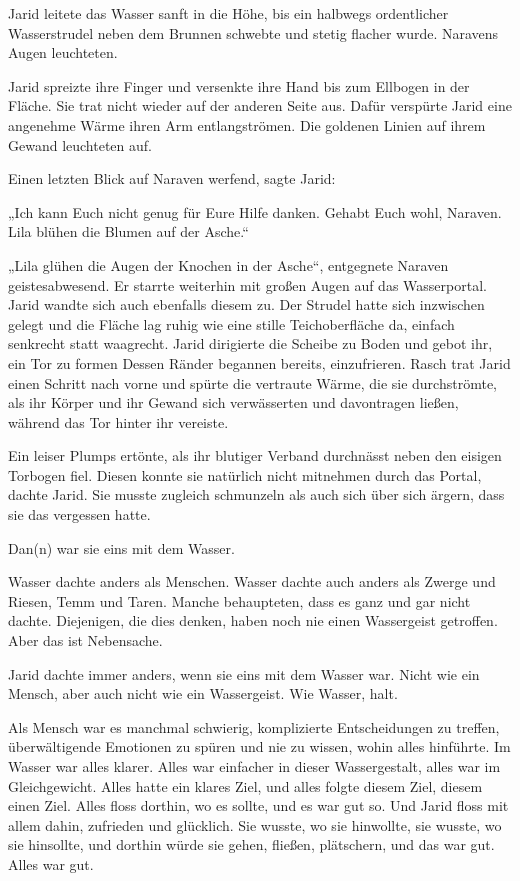 Jarid leitete das Wasser sanft in die Höhe, bis ein halbwegs ordentlicher Wasserstrudel neben dem Brunnen schwebte und stetig flacher wurde. Naravens Augen leuchteten.

Jarid spreizte ihre Finger und versenkte ihre Hand bis zum Ellbogen in der Fläche. Sie trat nicht wieder auf der anderen Seite aus. Dafür verspürte Jarid eine angenehme Wärme ihren Arm entlangströmen. Die goldenen Linien auf ihrem Gewand leuchteten auf.

Einen letzten Blick auf Naraven werfend, sagte Jarid:

„Ich kann Euch nicht genug für Eure Hilfe danken. Gehabt Euch wohl, Naraven. Lila blühen die Blumen auf der Asche.“

„Lila glühen die Augen der Knochen in der Asche“, entgegnete Naraven geistesabwesend. Er starrte weiterhin mit großen Augen auf das Wasserportal. Jarid wandte sich auch ebenfalls diesem zu. Der Strudel hatte sich inzwischen gelegt und die Fläche lag ruhig wie eine stille Teichoberfläche da, einfach senkrecht statt waagrecht. Jarid dirigierte die Scheibe zu Boden und gebot ihr, ein Tor zu formen Dessen Ränder begannen bereits, einzufrieren. Rasch trat Jarid einen Schritt nach vorne und spürte die vertraute Wärme, die sie durchströmte, als ihr Körper und ihr Gewand sich verwässerten und davontragen ließen, während das Tor hinter ihr vereiste.

Ein leiser Plumps ertönte, als ihr blutiger Verband durchnässt neben den eisigen Torbogen fiel. Diesen konnte sie natürlich nicht mitnehmen durch das Portal, dachte Jarid. Sie musste zugleich schmunzeln als auch sich über sich ärgern, dass sie das vergessen hatte.

Dan(n) war sie eins mit dem Wasser.\bigskip







Wasser dachte anders als Menschen. Wasser dachte auch anders als Zwerge und Riesen, Temm und Taren. Manche behaupteten, dass es ganz und gar nicht dachte. Diejenigen, die dies denken, haben noch nie einen Wassergeist getroffen. Aber das ist Nebensache.

Jarid dachte immer anders, wenn sie eins mit dem Wasser war. Nicht wie ein Mensch, aber auch nicht wie ein Wassergeist. Wie Wasser, halt.

Als Mensch war es manchmal schwierig, komplizierte Entscheidungen zu treffen, überwältigende Emotionen zu spüren und nie zu wissen, wohin alles hinführte. Im Wasser war alles klarer. Alles war einfacher in dieser Wassergestalt, alles war im Gleichgewicht. Alles hatte ein klares Ziel, und alles folgte diesem Ziel, diesem einen Ziel. Alles floss dorthin, wo es sollte, und es war gut so. Und Jarid floss mit allem dahin, zufrieden und glücklich. Sie wusste, wo sie hinwollte, sie wusste, wo sie hinsollte, und dorthin würde sie gehen, fließen, plätschern, und das war gut. Alles war gut.

